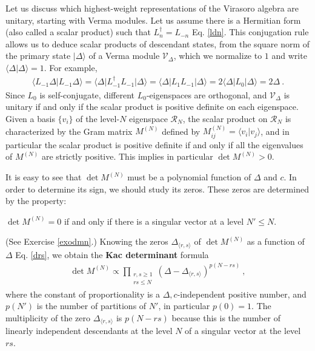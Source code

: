 \documentclass[12pt, a4paper, notitlepage, twoside]{report}
\numberwithin{equation}{section}
\theoremstyle{break}
\begin{document}
Let us discuss which highest-weight representations of the Virasoro algebra are unitary, starting with Verma modules. Let us assume there is a Hermitian form (also called a scalar product) such that $L_n^\dagger = L_{-n}$ Eq. \eqref{ldn}.
This conjugation rule allows us to deduce scalar products of descendant states, from the square norm of the primary state $|\Delta\rangle$ of a Verma module $\mathcal{V}_\Delta$, which we normalize to $1$ and write  $\langle \Delta|\Delta\rangle =1$. 
For example,
\begin{align}
 \langle L_{-1} \Delta|L_{-1}\Delta\rangle = \langle \Delta |L_{-1}^\dagger L_{-1}|\Delta\rangle =\langle \Delta |L_1 L_{-1}|\Delta\rangle = 2\langle \Delta|L_0|\Delta\rangle = 2\Delta\ . 
\label{levo} 
\end{align}
Since $L_0$ is self-conjugate, different $L_0$-eigenspaces are orthogonal, and $\mathcal V_\Delta$ is unitary if and only if the scalar product is positive definite on each eigenspace. 
Given a basis $\{v_i\}$ of the level-$N$ eigenspace $\mathcal{R}_N$, the scalar product on $\mathcal{R}_N$ is characterized by the Gram matrix $M^{(N)}$ defined by $M^{(N)}_{ij}=\langle v_i|v_j\rangle$, and in particular the scalar product is positive definite if and only if all the eigenvalues of $M^{(N)}$ are strictly positive. This implies in particular $\det M^{(N)}>0$.

It is easy to see that $\det M^{(N)}$ must be a polynomial function of $\Delta$ and $c$.
In order to determine its sign, we should study its zeros. These zeros are determined by the property:
\begin{center}
 \begin{minipage}{0.9\textwidth}
 $\det M^{(N)}=0$ if and only if there is a singular vector at a level $N'\leq N$.  
 \end{minipage}
\end{center}
(See Exercise \ref{exodmn}.) 
Knowing the zeros $\Delta_{\langle r,s \rangle}$ of $\det M^{(N)}$ as a function of $\Delta$ Eq. \eqref{drs}, we obtain the \textbf{\boldmath Kac determinant} formula
\begin{align}
 \boxed{\det M^{(N)} \propto \prod_{\begin{smallmatrix} r,s\geq 1 \\ rs \leq N \end{smallmatrix}} (\Delta-\Delta_{\langle r,s \rangle})^{p(N-rs)}} \ ,
\end{align}
where the constant of proportionality is a $\Delta,c$-independent positive number, and $p(N')$ is the number of partitions of $N'$, in particular $p(0)=1$.
The multiplicity of the zero $\Delta_{\langle r,s \rangle}$ is $p(N-rs)$ because this is the number of linearly independent descendants at the level $N$ of a singular vector at the level $rs$.  
\end{document}
